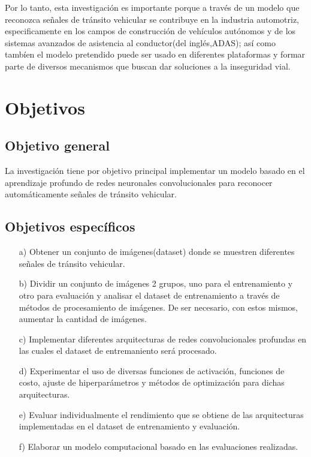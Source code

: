 	Por lo tanto, esta investigación es importante porque a través de un modelo que reconozca señales de tránsito vehicular se contribuye en la industria automotriz, especificamente en los campos de construcción de vehículos autónomos y de los sistemas avanzados de asistencia al conductor(del inglés,ADAS); así como tambíen el modelo pretendido puede ser usado en diferentes plataformas y formar parte de diversos mecanismos que buscan dar soluciones a la inseguridad vial.


\section{Objetivos}
	\subsection{Objetivo general}
	La investigación tiene por objetivo principal implementar un modelo basado en el aprendizaje profundo de redes neuronales convolucionales para reconocer automáticamente señales de tránsito vehicular.
	
	\vskip 0.2cm
		
	\subsection{Objetivos específicos}
	\begin{enumerate}
	
	\item[a)] Obtener un conjunto de imágenes(dataset) donde se muestren diferentes señales de tránsito vehicular.
	\item[b)] Dividir un conjunto de imágenes 2 grupos, uno para el entrenamiento y otro para evaluación y analisar el dataset de entrenamiento a través de métodos de procesamiento de imágenes. De ser necesario, con estos mismos, aumentar la cantidad de imágenes.
	\item[c)] Implementar diferentes arquitecturas de redes convolucionales profundas en las cuales el dataset de entremaniento será procesado.
	\item[d)] Experimentar el uso de diversas funciones de activación, funciones de costo, ajuste de hiperparámetros y métodos de optimización para dichas arquitecturas. 
	\item[e)] Evaluar individualmente el rendimiento que se obtiene de las arquitecturas implementadas en el dataset de entrenamiento y evaluación.
	\item[f)] Elaborar un modelo computacional basado en las evaluaciones realizadas.
	\end{enumerate}

